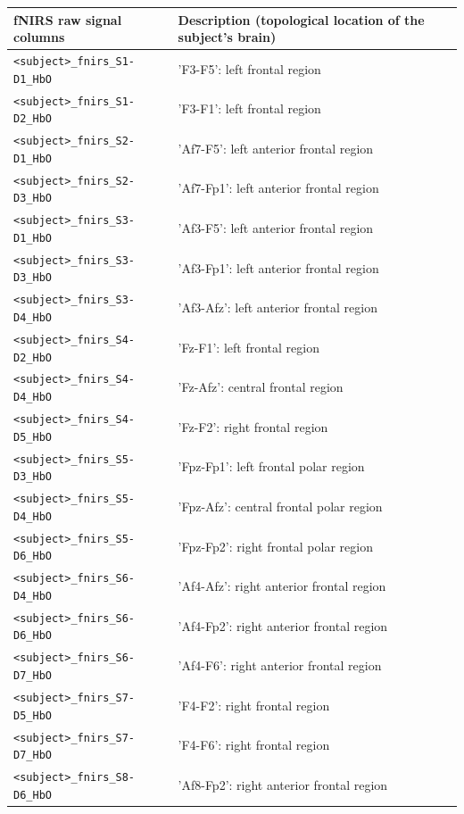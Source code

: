   \begin{table}
      \footnotesize
    \centering
    \begin{tabularx}{\textwidth}{lX}
    \toprule
    fNIRS raw signal columns & Description (topological location of the subject's brain) \\
    \midrule
    \texttt{<subject>\_fnirs\_S1-D1\_HbO} & 'F3-F5': left frontal region \\
    \texttt{<subject>\_fnirs\_S1-D2\_HbO} & 'F3-F1': left frontal region  \\
    \texttt{<subject>\_fnirs\_S2-D1\_HbO} & 'Af7-F5': left anterior frontal region  \\
    \texttt{<subject>\_fnirs\_S2-D3\_HbO} & 'Af7-Fp1': left anterior frontal region  \\
    \texttt{<subject>\_fnirs\_S3-D1\_HbO} & 'Af3-F5': left anterior frontal region  \\
    \texttt{<subject>\_fnirs\_S3-D3\_HbO} & 'Af3-Fp1': left anterior frontal region  \\
    \texttt{<subject>\_fnirs\_S3-D4\_HbO} & 'Af3-Afz': left anterior frontal region  \\
    \texttt{<subject>\_fnirs\_S4-D2\_HbO} & 'Fz-F1': left frontal region  \\
    \texttt{<subject>\_fnirs\_S4-D4\_HbO} & 'Fz-Afz': central frontal region  \\
    \texttt{<subject>\_fnirs\_S4-D5\_HbO} & 'Fz-F2': right frontal region  \\
    \texttt{<subject>\_fnirs\_S5-D3\_HbO} & 'Fpz-Fp1': left frontal polar region  \\
    \texttt{<subject>\_fnirs\_S5-D4\_HbO} & 'Fpz-Afz': central frontal polar region  \\
    \texttt{<subject>\_fnirs\_S5-D6\_HbO} & 'Fpz-Fp2': right frontal polar region  \\
    \texttt{<subject>\_fnirs\_S6-D4\_HbO} & 'Af4-Afz': right anterior frontal region  \\
    \texttt{<subject>\_fnirs\_S6-D6\_HbO} & 'Af4-Fp2': right anterior frontal region  \\
    \texttt{<subject>\_fnirs\_S6-D7\_HbO} & 'Af4-F6': right anterior frontal region  \\
    \texttt{<subject>\_fnirs\_S7-D5\_HbO} & 'F4-F2': right frontal region  \\
    \texttt{<subject>\_fnirs\_S7-D7\_HbO} & 'F4-F6': right frontal region  \\
    \texttt{<subject>\_fnirs\_S8-D6\_HbO} & 'Af8-Fp2': right anterior frontal region  \\

\end{tabularx}
\end{table}

